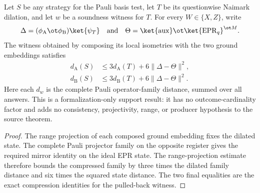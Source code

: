 \begin{theorem}
  \label{thm:pauli-naimark-operator-transfer-support}
  \leanok
  Let $S$ be any strategy for the Pauli basis test, let $T$ be its
  questionwise Naimark dilation, and let $w$ be a soundness witness for $T$.
  For every $W\in\{X,Z\}$, write
  \[
    \Delta = (\phi_{\mathrm A}\ot\phi_{\mathrm B})\ket{\psi_T}
      \quad\text{and}\quad
    \Theta = \ket{\mathrm{aux}}\ot\ket{\mathrm{EPR}_q}^{\ot M}.
  \]
  The witness obtained by composing its local isometries with the two ground
  embeddings satisfies
  \begin{align*}
    d_{\mathrm A}(S) &\leq 3d_{\mathrm A}(T)+6\|\Delta-\Theta\|^2,\\
    d_{\mathrm B}(S) &\leq 3d_{\mathrm B}(T)+6\|\Delta-\Theta\|^2.
  \end{align*}
  Here each $d_w$ is the complete Pauli operator-family distance, summed over
  all answers.  This is a formalization-only support result: it has no
  outcome-cardinality factor and adds no consistency, projectivity, range, or
  producer hypothesis to the source theorem.
\end{theorem}
\begin{proof}
  \leanok
  The range projection of each composed ground embedding fixes the dilated
  state.  The complete Pauli projector family on the opposite register gives
  the required mirror identity on the ideal EPR state.  The range-projection
  estimate therefore bounds the compressed family by three times the dilated
  family distance and six times the squared state distance.  The two final
  equalities are the exact compression identities for the pulled-back witness.
\end{proof}

